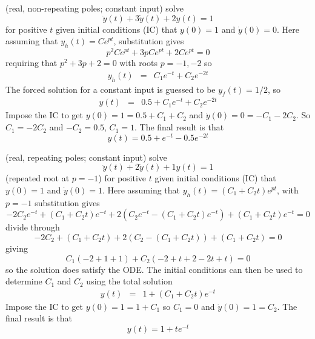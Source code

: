 \documentclass[12pt]{article}
\begin{document}
\begin{example}
(real, non-repeating poles; constant input) solve $$\ddot y(t) + 3 \dot y(t) + 2 y(t) = 1$$ for positive $t$ given initial conditions (IC) that $y(0)=1$ and $\dot y(0) = 0$. Here assuming that $y_h(t)=Ce^{pt}$, substitution gives
$$
p^2Ce^{pt} +3 pCe^{pt} + 2Ce^{pt} = 0
$$
requiring that $p^2+3p+2=0$ with roots $p=-1,-2$ so
\begin{eqnarray}
y_h(t) &=& C_1 e^{-t} + C_2 e^{-2t} 
\end{eqnarray}
The forced solution for a constant input is guessed to be $y_f(t) = 1/2$, so 
\begin{eqnarray}
y(t) &=& 0.5 + C_1 e^{-t} + C_2 e^{-2t} 
\end{eqnarray}
Impose the IC to get $y(0)=1 = 0.5 + C_1+C_2$ and $\dot y(0)= 0 = -C_1-2C_2$. So $C_1=-2C_2$ and $-C_2=0.5$, $C_1=1$. The final result is that
$$
y(t) = 0.5 +e^{-t} -0.5 e^{-2t}
$$
\end{example}

\begin{example}
(real, repeating poles; constant input) solve $$\ddot y(t) + 2 \dot y(t) + 1 y(t) = 1$$ (repeated root at $p=-1$) 
for positive $t$ given initial conditions (IC) that $y(0)=1$ and $\dot y(0) = 1$. 
Here assuming that $y_h(t) = (C_1 + C_2t) e^{pt}$, with $p=-1$ substitution gives
$$
-2C_2e^{-t} + (C_1 + C_2t) e^{-t} + 2(C_2 e^{-t} -(C_1 + C_2t) e^{-t}) + (C_1 + C_2t) e^{-t} = 0
$$
divide through
$$
-2 C_2  + (C_1 + C_2t) + 2(C_2 -(C_1 + C_2t)) + (C_1 + C_2t)  = 0
$$
giving
$$
C_1(-2+1+1) + C_2(-2 + t +2 -2t +t) = 0
$$
so the solution does satisfy the ODE. The initial conditions can then be used to determine $C_1$ and $C_2$ using the total solution
\begin{eqnarray}
y(t) &=& 1 + (C_1 + C_2t) e^{-t} 
\end{eqnarray}
Impose the IC to get $y(0)=1 = 1 + C_1$ so $C_1=0$ and $\dot y(0)= 1 = C_2 $. 
The final result is that
$$
y(t) = 1 + te^{-t} 
$$
\end{example}
\end{document}
